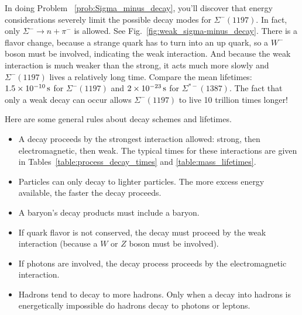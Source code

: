 In doing
Problem~
\ref{prob:Sigma_minus_decay},
you'll discover that energy considerations severely limit the possible
decay modes for $\Sigma^-(1197)$.  In fact, only $\Sigma^- \to n +
\pi^-$ is allowed.  See Fig.~\ref{fig:weak_sigma-minus_decay}.
There is a flavor change, because a strange quark has to turn into
an up quark, so a $W^-$ boson must be involved, indicating the weak
interaction.  And because the weak interaction is much weaker than the
strong, it acts much more slowly and $\Sigma^-(1197)$ lives a
relatively long time.  Compare the mean lifetimes: $1.5 \times 
10^{-10}\,\mbox{s}$
for $\Sigma^-(1197)$ and $2 \times 10^{-23}\,\mbox{s}$ for 
$\Sigma^{*-}(1387)$.
The fact that only a weak decay can occur allows $\Sigma^-(1197)$ to
live 10 trillion times longer!

Here are some general rules about decay schemes and lifetimes.
\begin{itemize}
\item A decay proceeds by the strongest interaction allowed:
  strong, then electromagnetic, then weak.  The typical times for these
  interactions are given in Tables~\ref{table:process_decay_times} and
  \ref{table:mass_lifetimes}.

\item Particles can only decay to lighter particles.  The more
  excess energy available, the faster the decay proceeds.

\item  A baryon's decay products must include a baryon.

\item If quark flavor is not conserved, the decay must proceed by the
  weak interaction (because a $W$ or $Z$ boson must be involved).

\item If photons are involved, the decay process proceeds by the
  electromagnetic interaction.

\item Hadrons tend to decay to more hadrons.  Only when a decay into
  hadrons is energetically impossible do hadrons decay to photons or
  leptons.

\end{itemize}

